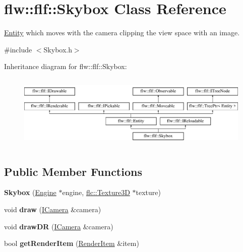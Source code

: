\hypertarget{classflw_1_1flf_1_1Skybox}{}\section{flw\+:\+:flf\+:\+:Skybox Class Reference}
\label{classflw_1_1flf_1_1Skybox}


\hyperlink{classflw_1_1flf_1_1Entity}{Entity} which moves with the camera clipping the view space with an image.  




{\ttfamily \#include $<$Skybox.\+h$>$}

Inheritance diagram for flw\+:\+:flf\+:\+:Skybox\+:\begin{figure}[H]
\begin{center}
\leavevmode
\includegraphics[height=3.589744cm]{classflw_1_1flf_1_1Skybox}
\end{center}
\end{figure}
\subsection*{Public Member Functions}
\begin{DoxyCompactItemize}
\item 
\mbox{\label{classflw_1_1flf_1_1Skybox_a676e7c813bc505d212ff6e7653509662}} 
{\bfseries Skybox} (\hyperlink{classflw_1_1Engine}{Engine} $\ast$engine, \hyperlink{classflw_1_1flc_1_1Texture3D}{flc\+::\+Texture3D} $\ast$texture)
\item 
\mbox{\label{classflw_1_1flf_1_1Skybox_a59640fb89ee41d38e991d351921626af}} 
void {\bfseries draw} (\hyperlink{classflw_1_1flf_1_1ICamera}{I\+Camera} \&camera)
\item 
\mbox{\label{classflw_1_1flf_1_1Skybox_a301efdf18a2572682f3a10ab44ffe457}} 
void {\bfseries draw\+DR} (\hyperlink{classflw_1_1flf_1_1ICamera}{I\+Camera} \&camera)
\item 
\mbox{\label{classflw_1_1flf_1_1Skybox_aab7e845c4c6d95c24a6995c6e637f90d}} 
bool {\bfseries get\+Render\+Item} (\hyperlink{structflw_1_1flf_1_1RenderItem}{Render\+Item} \&item)
\end{DoxyCompactItemize}
